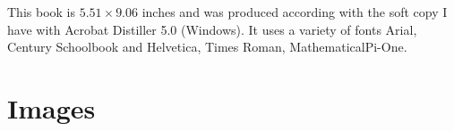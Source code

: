 This book is $5.51\times9.06$ inches and was produced according with the soft copy I have with Acrobat Distiller 5.0 (Windows). It uses a variety of fonts Arial, Century Schoolbook and Helvetica, Times Roman, MathematicalPi-One.
\medskip
\begin{figure}[ht]
\centering
{}
\end{figure}
\lipsum[2]

\section{Images}

